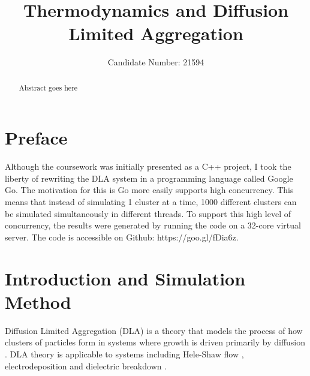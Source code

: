 \documentclass[11pt]{iopart}
\begin{document}
\setlength{\marginparwidth}{1.5cm}

\title[]{Thermodynamics and Diffusion Limited Aggregation}

\author{Candidate Number: 21594}

\address{Department of Physics,
University of Bath, Bath BA2 7AY, United Kingdom}
\begin{abstract}
Abstract goes here
\end{abstract}



\section*{Preface}
Although the coursework was initially presented as a C++ project, I took the liberty of rewriting the DLA system in a programming language called Google Go. The motivation for this is Go more easily supports high concurrency. This means that instead of simulating 1 cluster at a time, 1000 different clusters can be simulated simultaneously in different threads. To support this high level of concurrency, the results were generated by running the code on a 32-core virtual server. The code is accessible on Github: https://goo.gl/fDia6z.

\section{Introduction and Simulation Method}

Diffusion Limited Aggregation (DLA) is a theory that models the process of how clusters of particles form in systems where growth is driven primarily by diffusion \cite{dla}. DLA theory is applicable to systems including Hele-Shaw flow \cite{heleshaw}, electrodeposition \cite{electrodeposition} and dielectric breakdown \cite{electricbreakdown}.
\end{document}
